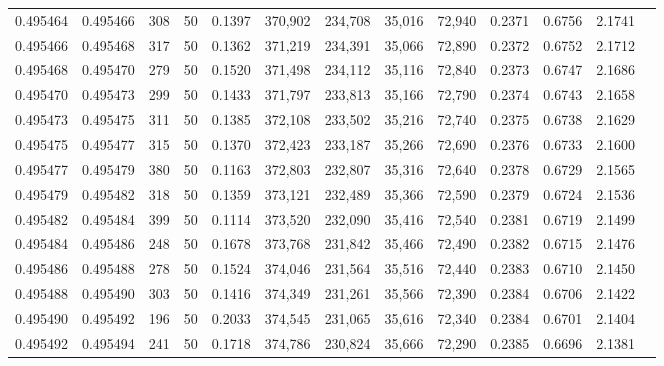 \begin{tabular}{rrrrrrrrrrrrr}
0.495464 & 0.495466 &   308 &  50 &                                     0.1397 & 370,902 & 234,708 &  35,016 &  72,940 & 0.2371 & 0.6756 & 2.1741 \\
0.495466 & 0.495468 &   317 &  50 &                                     0.1362 & 371,219 & 234,391 &  35,066 &  72,890 & 0.2372 & 0.6752 & 2.1712 \\
0.495468 & 0.495470 &   279 &  50 &                                     0.1520 & 371,498 & 234,112 &  35,116 &  72,840 & 0.2373 & 0.6747 & 2.1686 \\
0.495470 & 0.495473 &   299 &  50 &                                     0.1433 & 371,797 & 233,813 &  35,166 &  72,790 & 0.2374 & 0.6743 & 2.1658 \\
0.495473 & 0.495475 &   311 &  50 &                                     0.1385 & 372,108 & 233,502 &  35,216 &  72,740 & 0.2375 & 0.6738 & 2.1629 \\
0.495475 & 0.495477 &   315 &  50 &                                     0.1370 & 372,423 & 233,187 &  35,266 &  72,690 & 0.2376 & 0.6733 & 2.1600 \\
0.495477 & 0.495479 &   380 &  50 &                                     0.1163 & 372,803 & 232,807 &  35,316 &  72,640 & 0.2378 & 0.6729 & 2.1565 \\
0.495479 & 0.495482 &   318 &  50 &                                     0.1359 & 373,121 & 232,489 &  35,366 &  72,590 & 0.2379 & 0.6724 & 2.1536 \\
0.495482 & 0.495484 &   399 &  50 &                                     0.1114 & 373,520 & 232,090 &  35,416 &  72,540 & 0.2381 & 0.6719 & 2.1499 \\
0.495484 & 0.495486 &   248 &  50 &                                     0.1678 & 373,768 & 231,842 &  35,466 &  72,490 & 0.2382 & 0.6715 & 2.1476 \\
0.495486 & 0.495488 &   278 &  50 &                                     0.1524 & 374,046 & 231,564 &  35,516 &  72,440 & 0.2383 & 0.6710 & 2.1450 \\
0.495488 & 0.495490 &   303 &  50 &                                     0.1416 & 374,349 & 231,261 &  35,566 &  72,390 & 0.2384 & 0.6706 & 2.1422 \\
0.495490 & 0.495492 &   196 &  50 &                                     0.2033 & 374,545 & 231,065 &  35,616 &  72,340 & 0.2384 & 0.6701 & 2.1404 \\
0.495492 & 0.495494 &   241 &  50 &                                     0.1718 & 374,786 & 230,824 &  35,666 &  72,290 & 0.2385 & 0.6696 & 2.1381 \\

\end{tabular}
